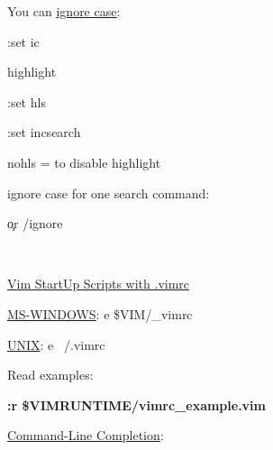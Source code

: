\documentclass[12pt, letterpaper]{article}
\begin{document}
\begin{flushleft}
You can \underline{\underline{ignore case}}: \\
\par

:set ic \\
\par

highlight \\
\par

:set hls \\
\par

:set incsearch \\
\par

nohls = to disable highlight \\
\par

ignore case for one search command: \par
\c or /ignore\c \\
\par

 \\
\par

\underline{Vim StartUp Scripts with .vimrc} \\
\par

\underline{MS-WINDOWS}: e \$VIM/_vimrc \\
\par

\underline{UNIX}: e ~/.vimrc \\
\par
Read examples:

\textbf{:r \$VIMRUNTIME/vimrc_example.vim} \\
\par

\underline{Command-Line Completion}: \\
\par


\end{flushleft}
\end{document}
